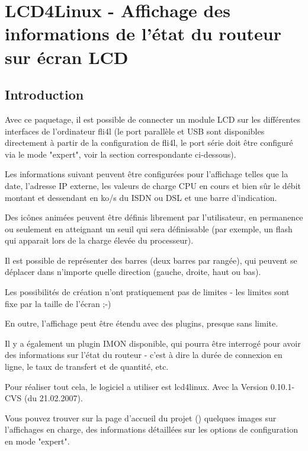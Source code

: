 {
  \section {LCD4Linux - Affichage des informations de l'état du routeur sur écran LCD}
}

\subsection{Introduction}

    Avec ce paquetage, il est possible de connecter un module LCD sur les
	différentes interfaces de l'ordinateur fli4l (le port parallèle et USB
	sont disponibles directement à partir de la configuration de fli4l,
	le port série doit être configuré via le mode "expert", voir la section
	correspondante ci-dessous).

    Les informations suivant peuvent être configurées pour l'affichage telles
	que la date, l'adresse IP externe, les valeurs de charge CPU en cours et
	bien sûr le débit montant et dessendant en ko/s du ISDN ou DSL et une barre
	d'indication.

    Des icônes animées peuvent être définis librement par l'utilisateur, en
	permanence ou seulement en atteignant un seuil qui sera définissable 
	(par exemple, un flash qui apparait lors de la charge élevée du processeur).

    Il est possible de représenter des barres (deux barres par rangée), qui
	peuvent se déplacer dans n'importe quelle direction (gauche, droite, haut ou bas).

    Les possibilités de création n'ont pratiquement pas de limites - les limites
	sont fixe par la taille de l'écran ;-)

    En outre, l'affichage peut être étendu avec des plugins, presque sans limite.

    Il y a également un plugin IMON disponible, qui pourra être interrogé pour avoir
	des informations sur l'état du routeur - c'est à dire la durée de connexion en ligne,
	le taux de transfert et de quantité, etc.

    Pour réaliser tout cela,  le logiciel a utiliser est lcd4linux. Avec la
    Version 0.10.1-CVS (du 21.02.2007).

    Vous pouvez trouver sur la page d'accueil du projet
    ()
    quelques images sur l'affichages en charge, des informations détaillées sur
	les options de configuration en mode "expert".

